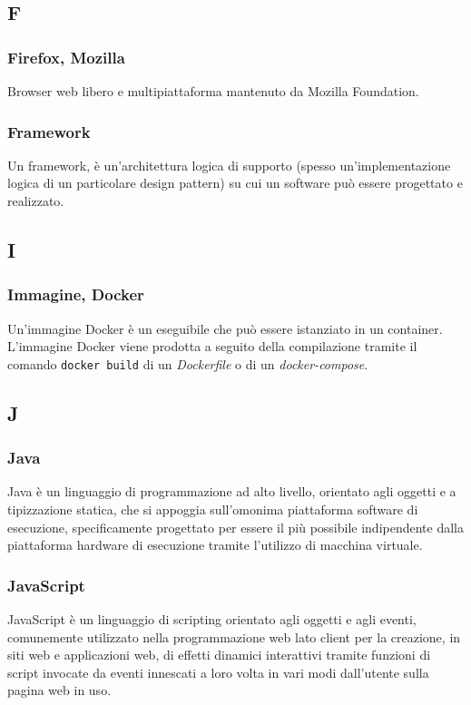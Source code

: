 \subsection{F}
\subsubsection{Firefox, Mozilla}
Browser web libero e multipiattaforma mantenuto da Mozilla Foundation.
\subsubsection{Framework}  Un framework, è un'architettura logica di supporto (spesso un'implementazione logica di un particolare design pattern) su cui un software può essere progettato e realizzato.
\subsection{I}
\subsubsection{Immagine, Docker} Un'immagine Docker è un eseguibile che può essere istanziato in un container. L'immagine Docker viene prodotta a seguito della compilazione tramite il comando \verb!docker build! di un \textit{Dockerfile} o di un \textit{docker-compose}.
\subsection{J}
\subsubsection{Java}  Java è un linguaggio di programmazione ad alto livello, orientato agli oggetti e a tipizzazione statica, che si appoggia sull'omonima piattaforma software di esecuzione, specificamente progettato per essere il più possibile indipendente dalla piattaforma hardware di esecuzione tramite l'utilizzo di macchina virtuale.
\subsubsection{JavaScript}  JavaScript è un linguaggio di scripting orientato agli oggetti e agli eventi, comunemente utilizzato nella programmazione web lato client per la creazione, in siti web e applicazioni web, di effetti dinamici interattivi tramite funzioni di script invocate da eventi innescati a loro volta in vari modi dall'utente sulla pagina web in uso.
